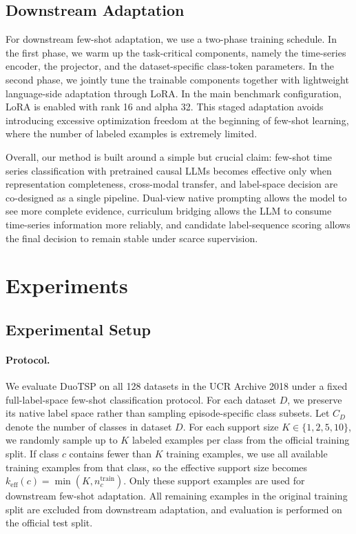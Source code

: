 \documentclass{article}
\begin{document}
    \subsection{Downstream Adaptation}
    
    For downstream few-shot adaptation, we use a two-phase training schedule.
    In the first phase, we warm up the task-critical components, namely the time-series encoder, the projector, and the dataset-specific class-token parameters.
    In the second phase, we jointly tune the trainable components together with lightweight language-side adaptation through LoRA.
    In the main benchmark configuration, LoRA is enabled with rank 16 and alpha 32.
    This staged adaptation avoids introducing excessive optimization freedom at the beginning of few-shot learning, where the number of labeled examples is extremely limited.
    
    Overall, our method is built around a simple but crucial claim: few-shot time series classification with pretrained causal LLMs becomes effective only when representation completeness, cross-modal transfer, and label-space decision are co-designed as a single pipeline.
    Dual-view native prompting allows the model to see more complete evidence, curriculum bridging allows the LLM to consume time-series information more reliably, and candidate label-sequence scoring allows the final decision to remain stable under scarce supervision.




\section{Experiments}
\label{sec:experiments}

\subsection{Experimental Setup}

\paragraph{Protocol.}
We evaluate DuoTSP on all 128 datasets in the UCR Archive 2018 under a fixed full-label-space few-shot classification protocol.
For each dataset $D$, we preserve its native label space rather than sampling episode-specific class subsets.
Let $C_D$ denote the number of classes in dataset $D$.
For each support size $K \in \{1,2,5,10\}$, we randomly sample up to $K$ labeled examples per class from the official training split.
If class $c$ contains fewer than $K$ training examples, we use all available training examples from that class, so the effective support size becomes $k_{\mathrm{eff}}(c)=\min(K, n_c^{\mathrm{train}})$.
Only these support examples are used for downstream few-shot adaptation.
All remaining examples in the original training split are excluded from downstream adaptation, and evaluation is performed on the official test split.
\end{document}

